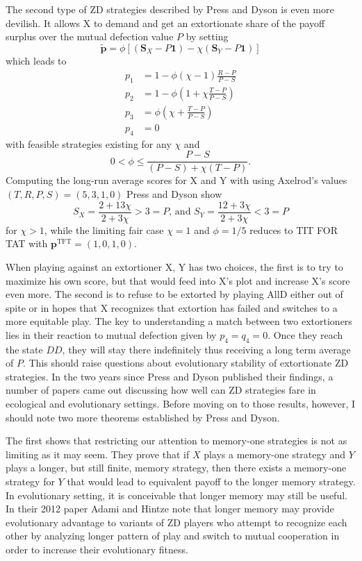The second type of ZD strategies described by Press and Dyson is even more devilish. It allows X to demand and get an extortionate share of the payoff surplus over the mutual defection value $P$ by setting
\[
\tilde{\mathbf{p}} = \phi [(\mathbf{S}_X - P\mathbf{1}) - \chi (\mathbf{S}_Y - P \mathbf{1})]
\]
which leads to
\begin{align*}
p_1 &= 1 - \phi(\chi-1) \frac{R-P}{P-S} \\
p_2 &= 1 - \phi\left(1 + \chi \frac{T-P}{P-S}\right) \\
p_3 &= \phi (\chi + \frac{T-P}{P-S}) \\
p_4 &= 0
\end{align*}
with feasible strategies existing for any $\chi$ and
\[
0 < \phi \leq \frac{P-S}{(P-S) + \chi(T-P)}.
\]
Computing the long-run average scores for X and Y with using Axelrod's values $(T, R, P, S) = (5, 3, 1, 0)$ Press and Dyson show
\[
S_X = \frac{2 + 13\chi}{2 + 3\chi} > 3 = P\textrm{, and } S_Y = \frac{12 + 3\chi}{2 + 3\chi} < 3 = P
\]
for $\chi > 1$, while the limiting fair case $\chi = 1$ and $\phi = 1/5$ reduces to TIT FOR TAT with $\mathbf{p}^\textrm{TFT} = (1, 0, 1, 0)$.

When playing against an extortioner X, Y has two choices, the first is to try to maximize his own score, but that would feed into X's plot and increase X's score even more. The second is to refuse to be extorted by playing AllD either out of spite or in hopes that X recognizes that extortion has failed and switches to a more equitable play. The key to understanding a match between two extortioners lies in their reaction to mutual defection given by $p_4 = q_4 = 0$. Once they reach the state $DD$, they will stay there indefinitely thus receiving a long term average of $P$. This should raise questions about evolutionary stability of extortionate ZD strategies. In the two years since Press and Dyson published their findings, a number of papers came out discussing how well can ZD strategies fare in ecological and evolutionary settings. Before moving on to those results, however, I should note two more theorems established by Press and Dyson.

The first shows that restricting our attention to memory-one strategies is not as limiting as it may seem. They prove that if $X$ plays a memory-one strategy and $Y$ plays a longer, but still finite, memory strategy, then there exists a memory-one strategy for $Y$ that would lead to equivalent payoff to the longer memory strategy. In evolutionary setting, it is conceivable that longer memory may still be useful. In their 2012 paper Adami and Hintze \cite{Adami_Hintze_2014} note that longer memory may provide evolutionary advantage to variants of ZD players who attempt to recognize each other by analyzing longer pattern of play and switch to mutual cooperation in order to increase their evolutionary fitness.

